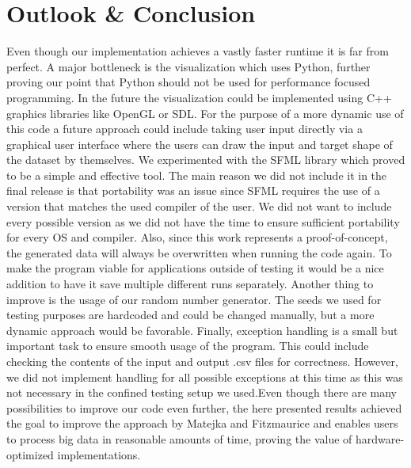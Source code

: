 \documentclass[sigconf]{acmart}
\begin{document}
\section{Outlook \& Conclusion} \label{conclusion}
Even though our implementation achieves a vastly faster runtime it is far from perfect. A major bottleneck is the visualization which uses Python, further proving our point that Python should not be used for performance focused programming. In the future the visualization could be 
implemented using C++ graphics libraries like OpenGL or SDL. For the purpose of a more dynamic use of this code a future approach could include taking user input directly via a graphical user interface where the users can draw the input and target shape of the dataset by themselves. We experimented with the
SFML library which proved to be a simple and effective tool. The main reason we did not include it in the final release is that portability was an issue since SFML requires the use of a version that matches the used compiler of the user. We did not want to include every possible 
version as we did not have the time to ensure sufficient portability for every OS and compiler. Also, since this work represents a proof-of-concept, the generated data will always be overwritten when running the code again. To make the program viable for applications outside of testing
it would be a nice addition to have it save multiple different runs separately. Another thing to improve is the usage of our random number generator. The seeds we used for testing purposes are hardcoded and could be changed manually, but a more dynamic approach would be favorable. 
Finally, exception handling is a small but important task to ensure smooth usage of the program. This could include checking the contents of the input and output .csv files for correctness. However, we did not implement handling for all possible exceptions at this time as
this was not necessary in the confined testing setup we used.\newline\newline Even though there are many possibilities to improve our code even further, the here presented results achieved the goal to improve the approach by Matejka and Fitzmaurice and enables users to process big data
in reasonable amounts of time, proving the value of hardware-optimized implementations. 

\end{document}
